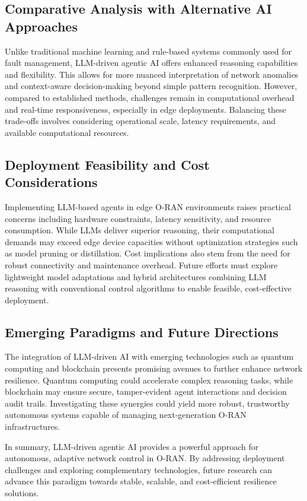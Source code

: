 \documentclass[sigconf]{acmart}
\begin{document}
\subsection{Comparative Analysis with Alternative AI Approaches}
Unlike traditional machine learning and rule-based systems commonly used for fault management, LLM-driven agentic AI offers enhanced reasoning capabilities and flexibility. This allows for more nuanced interpretation of network anomalies and context-aware decision-making beyond simple pattern recognition. However, compared to established methods, challenges remain in computational overhead and real-time responsiveness, especially in edge deployments. Balancing these trade-offs involves considering operational scale, latency requirements, and available computational resources.

\subsection{Deployment Feasibility and Cost Considerations}
Implementing LLM-based agents in edge O-RAN environments raises practical concerns including hardware constraints, latency sensitivity, and resource consumption. While LLMs deliver superior reasoning, their computational demands may exceed edge device capacities without optimization strategies such as model pruning or distillation. Cost implications also stem from the need for robust connectivity and maintenance overhead. Future efforts must explore lightweight model adaptations and hybrid architectures combining LLM reasoning with conventional control algorithms to enable feasible, cost-effective deployment.

\subsection{Emerging Paradigms and Future Directions}
The integration of LLM-driven AI with emerging technologies such as quantum computing and blockchain presents promising avenues to further enhance network resilience. Quantum computing could accelerate complex reasoning tasks, while blockchain may ensure secure, tamper-evident agent interactions and decision audit trails. Investigating these synergies could yield more robust, trustworthy autonomous systems capable of managing next-generation O-RAN infrastructures.

In summary, LLM-driven agentic AI provides a powerful approach for autonomous, adaptive network control in O-RAN. By addressing deployment challenges and exploring complementary technologies, future research can advance this paradigm towards stable, scalable, and cost-efficient resilience solutions.
\end{document}
